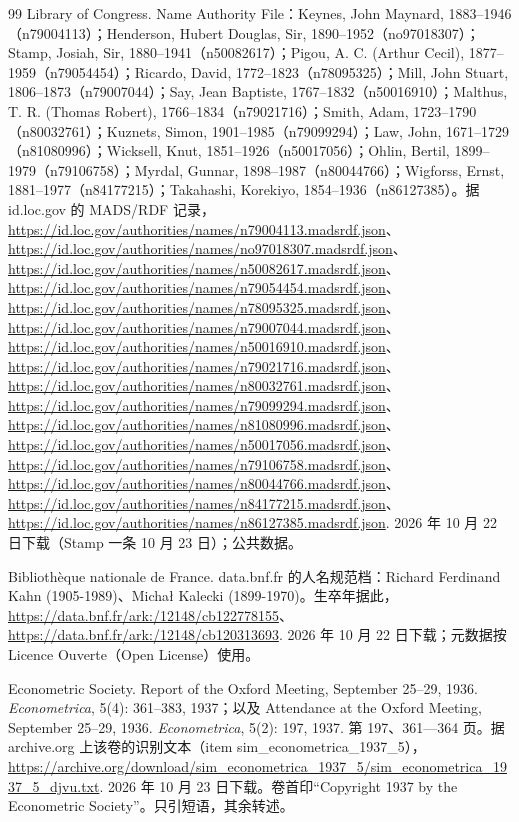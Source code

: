 \begin{thebibliography}{99}
 Library of Congress. Name Authority File：Keynes, John Maynard, 1883--1946（n79004113）；Henderson, Hubert Douglas, Sir, 1890--1952（no97018307）；Stamp, Josiah, Sir, 1880--1941（n50082617）；Pigou, A. C. (Arthur Cecil), 1877--1959（n79054454）；Ricardo, David, 1772--1823（n78095325）；Mill, John Stuart, 1806--1873（n79007044）；Say, Jean Baptiste, 1767--1832（n50016910）；Malthus, T. R. (Thomas Robert), 1766--1834（n79021716）；Smith, Adam, 1723--1790（n80032761）；Kuznets, Simon, 1901--1985（n79099294）；Law, John, 1671--1729（n81080996）；Wicksell, Knut, 1851--1926（n50017056）；Ohlin, Bertil, 1899--1979（n79106758）；Myrdal, Gunnar, 1898--1987（n80044766）；Wigforss, Ernst, 1881--1977（n84177215）；Takahashi, Korekiyo, 1854--1936（n86127385）。据 id.loc.gov 的 MADS/RDF 记录，\url{https://id.loc.gov/authorities/names/n79004113.madsrdf.json}、\url{https://id.loc.gov/authorities/names/no97018307.madsrdf.json}、\url{https://id.loc.gov/authorities/names/n50082617.madsrdf.json}、\url{https://id.loc.gov/authorities/names/n79054454.madsrdf.json}、\url{https://id.loc.gov/authorities/names/n78095325.madsrdf.json}、\url{https://id.loc.gov/authorities/names/n79007044.madsrdf.json}、\url{https://id.loc.gov/authorities/names/n50016910.madsrdf.json}、\url{https://id.loc.gov/authorities/names/n79021716.madsrdf.json}、\url{https://id.loc.gov/authorities/names/n80032761.madsrdf.json}、\url{https://id.loc.gov/authorities/names/n79099294.madsrdf.json}、\url{https://id.loc.gov/authorities/names/n81080996.madsrdf.json}、\url{https://id.loc.gov/authorities/names/n50017056.madsrdf.json}、\url{https://id.loc.gov/authorities/names/n79106758.madsrdf.json}、\url{https://id.loc.gov/authorities/names/n80044766.madsrdf.json}、\url{https://id.loc.gov/authorities/names/n84177215.madsrdf.json}、\url{https://id.loc.gov/authorities/names/n86127385.madsrdf.json}. 2026 年 10 月 22 日下载（Stamp 一条 10 月 23 日）；公共数据。

 Bibliothèque nationale de France. data.bnf.fr 的人名规范档：Richard Ferdinand Kahn (1905-1989)、Michał Kalecki (1899-1970)。生卒年据此，\url{https://data.bnf.fr/ark:/12148/cb122778155}、\url{https://data.bnf.fr/ark:/12148/cb120313693}. 2026 年 10 月 22 日下载；元数据按 Licence Ouverte（Open License）使用。

 Econometric Society. Report of the Oxford Meeting, September 25--29, 1936. \emph{Econometrica}, 5(4): 361--383, 1937；以及 Attendance at the Oxford Meeting, September 25--29, 1936. \emph{Econometrica}, 5(2): 197, 1937. 第 197、361—364 页。据 archive.org 上该卷的识别文本（item sim\_econometrica\_1937\_5），\url{https://archive.org/download/sim_econometrica_1937_5/sim_econometrica_1937_5_djvu.txt}. 2026 年 10 月 23 日下载。卷首印“Copyright 1937 by the Econometric Society”。只引短语，其余转述。


\end{thebibliography}
